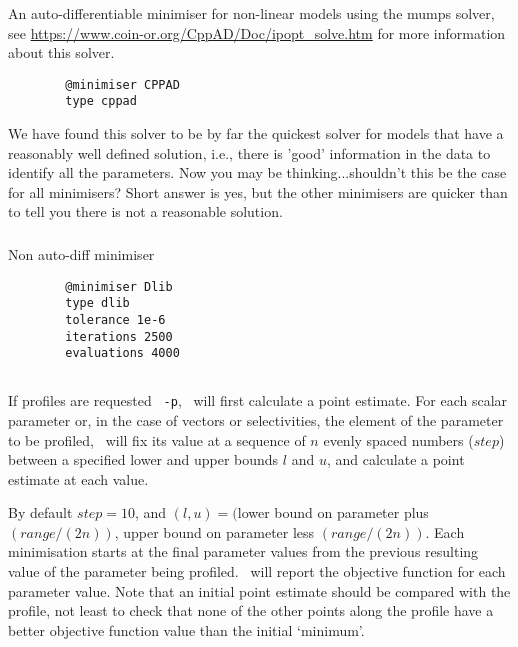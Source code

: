 An auto-differentiable minimiser for non-linear models using the mumps solver, see \url{https://www.coin-or.org/CppAD/Doc/ipopt_solve.htm} for more information about this solver.

{\small{\begin{verbatim}
		@minimiser CPPAD
		type cppad
		\end{verbatim}}}

We have found this solver to be by far the quickest solver for models that have a reasonably well defined solution, i.e., there is 'good' information in the data to identify all the parameters. Now you may be thinking...shouldn't this be the case for all minimisers? Short answer is yes, but the other minimisers are quicker than  to tell you there is not a reasonable solution.

\subsubsection{}

Non auto-diff minimiser
{\small{\begin{verbatim}
		@minimiser Dlib
		type dlib
		tolerance 1e-6
		iterations 2500
		evaluations 4000
		\end{verbatim}}}

\subsection{\label{sec:estimate-profiles}}

If profiles are requested \texttt{\cname\ -p}, \CNAME\ will first calculate a point estimate. For each scalar parameter or, in the case of vectors or selectivities, the element of the parameter to be profiled, \CNAME\ will fix its value at a sequence of $n$ evenly spaced numbers ($step$) between a specified lower and upper bounds $l$ and $u$, and calculate a point estimate at each value.

By default $step=10$, and $(l, u)=($lower bound on parameter plus $(range/(2n))$, upper bound on parameter less $(range/(2n))$. Each minimisation starts at the final parameter values from the previous resulting value of the parameter being profiled. \CNAME\ will report the objective function for each parameter value. Note that an initial point estimate should be compared with the profile, not least to check that none of the other points along the profile have a better objective function value than the initial `minimum'.

